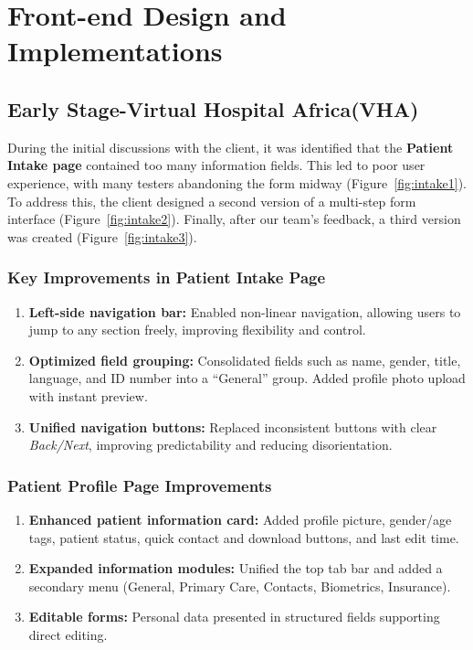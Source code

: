 \section{Front-end Design and Implementations}
\label{sec:sec02}

\subsection{Early Stage-Virtual Hospital Africa(VHA)}
\label{subsec:subsec01}

During the initial discussions with the client, it was identified that the \textbf{Patient Intake page}
contained too many information fields. This led to poor user experience, with many testers
abandoning the form midway (Figure~\ref{fig:intake1}).
To address this, the client designed a second version of a multi-step form interface (Figure~\ref{fig:intake2}).
Finally, after our team's feedback, a third version was created (Figure~\ref{fig:intake3}).

\subsubsection{Key Improvements in Patient Intake Page}
\begin{enumerate}
    \item \textbf{Left-side navigation bar:} Enabled non-linear navigation, allowing users to jump to
    any section freely, improving flexibility and control.
    \item \textbf{Optimized field grouping:} Consolidated fields such as name, gender, title, language,
    and ID number into a ``General'' group. Added profile photo upload with instant preview.
    \item \textbf{Unified navigation buttons:} Replaced inconsistent buttons with clear
    \emph{Back/Next}, improving predictability and reducing disorientation.
\end{enumerate}

\subsubsection{Patient Profile Page Improvements}
\begin{enumerate}
    \item \textbf{Enhanced patient information card:} Added profile picture, gender/age tags, patient status,
    quick contact and download buttons, and last edit time.
    \item \textbf{Expanded information modules:} Unified the top tab bar and added a secondary menu
    (General, Primary Care, Contacts, Biometrics, Insurance).
    \item \textbf{Editable forms:} Personal data presented in structured fields supporting direct editing.
\end{enumerate}

